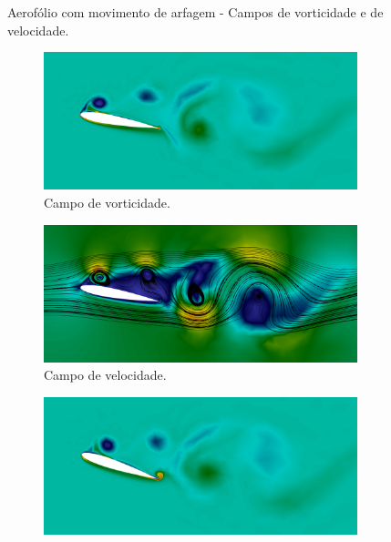 \begin{figure}[h!]
    \centering
    \caption{Aerofólio com movimento de arfagem - Campos de vorticidade e de velocidade.}
    \begin{subfigure}{.49\linewidth}
        \centering
        \caption*{Campo de vorticidade.}
        \includegraphics[width=\linewidth]{Figuras/rotating-airfoil/vort1.png}
    \end{subfigure}
    \begin{subfigure}{.49\linewidth}
        \centering
        \caption*{Campo de velocidade.}
        \includegraphics[width=\linewidth]{Figuras/rotating-airfoil/str1.png}
    \end{subfigure}
    \caption*{Instante $t=8,0$.}
    \begin{subfigure}{.49\linewidth}
        \centering
        \includegraphics[width=\linewidth]{Figuras/rotating-airfoil/vort2.png}

\end{subfigure}
\end{figure}
